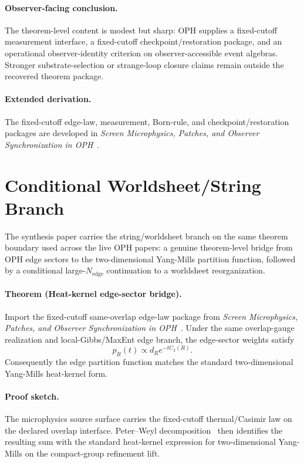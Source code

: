 \paragraph{Observer-facing conclusion.}
The theorem-level content is modest but sharp: OPH supplies a fixed-cutoff measurement interface,
a fixed-cutoff checkpoint/restoration package, and an operational observer-identity criterion on
observer-accessible event algebras. Stronger substrate-selection or strange-loop closure claims
remain outside the recovered theorem package.

\paragraph{Extended derivation.}
The fixed-cutoff edge-law, measurement, Born-rule, and checkpoint/restoration packages are developed in
\emph{Screen Microphysics, Patches, and Observer Synchronization in OPH}~\cite{ophmicrophysics}.

\section{Conditional Worldsheet/String Branch}

The synthesis paper carries the string/worldsheet branch on the same theorem boundary used across
the live OPH papers: a genuine theorem-level bridge from OPH edge sectors to the two-dimensional
Yang-Mills partition function, followed by a conditional large-\(N_{\mathrm{edge}}\) continuation
to a worldsheet reorganization.

\paragraph{Theorem (Heat-kernel edge-sector bridge).}
Import the fixed-cutoff same-overlap edge-law package from
\emph{Screen Microphysics, Patches, and Observer Synchronization in OPH}~\cite{ophmicrophysics}.
Under the same overlap-gauge realization and local-Gibbs/MaxEnt edge branch, the edge-sector
weights satisfy
\[
p_R(t)\propto d_R e^{-t C_2(R)}.
\]
Consequently the edge partition function matches the standard two-dimensional Yang-Mills
heat-kernel form.

\paragraph{Proof sketch.}
The microphysics source surface carries the fixed-cutoff thermal/Casimir law on the declared
overlap interface. Peter--Weyl decomposition~\cite{peterWeyl27}
then identifies the resulting sum with the standard heat-kernel expression for
two-dimensional Yang-Mills on the compact-group refinement lift.


